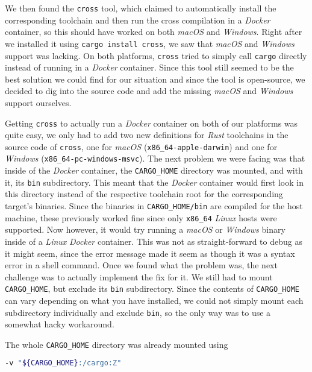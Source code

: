 We then found the \texttt{cross} \cite{cross} tool, which claimed to automatically install the
corresponding toolchain and then run the cross compilation in a \textit{Docker} container, so this
should have worked on both \textit{macOS} and \textit{Windows}. Right after we installed it using
\texttt{cargo install cross}, we saw that \textit{macOS} and \textit{Windows} support was lacking.
On both platforms, \texttt{cross} tried to simply call \texttt{cargo} directly instead of running in
a \textit{Docker} container. Since this tool still seemed to be the best solution we could find for
our situation and since the tool is open-source, we decided to dig into the source code and add the
missing \textit{macOS} and \textit{Windows} support ourselves.

Getting \texttt{cross} to actually run a \textit{Docker} container on both of our platforms was
quite easy, we only had to add two new definitions for \textit{Rust} toolchains in the source code
of \texttt{cross}, one for \textit{macOS} (\texttt{x86\_64-apple-darwin}) and one for
\textit{Windows} (\texttt{x86\_64-pc-windows-msvc}). The next problem we were facing was that inside
of the \textit{Docker} container, the \texttt{CARGO\_HOME} directory was mounted, and with it, its
\texttt{bin} subdirectory. This meant that the \textit{Docker} container would first look in this
directory instead of the respective toolchain root for the corresponding target's binaries. Since
the binaries in \texttt{CARGO\_HOME/bin} are compiled for the host machine, these previously worked
fine since only \texttt{x86\_64} \textit{Linux} hosts were supported. Now however, it would try
running a \textit{macOS} or \textit{Windows} binary inside of a \textit{Linux} \textit{Docker}
container. This was not as straight-forward to debug as it might seem, since the error message made
it seem as though it was a syntax error in a shell command. Once we found what the problem was, the
next challenge was to actually implement the fix for it. We still had to mount \texttt{CARGO\_HOME},
but exclude its \texttt{bin} subdirectory. Since the contents of \texttt{CARGO\_HOME} can vary
depending on what you have installed, we could not simply mount each subdirectory individually and
exclude \texttt{bin}, so the only way was to use a somewhat hacky workaround.

The whole \texttt{CARGO\_HOME} directory was already mounted using

\begin{lstlisting}[language=Bash]
-v "${CARGO_HOME}:/cargo:Z"
\end{lstlisting}

